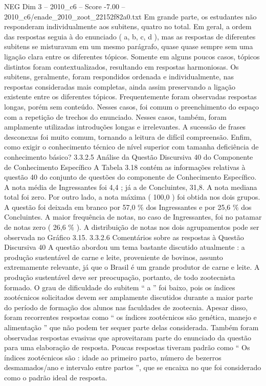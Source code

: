 \begin{textsample}{NEG Dim 3 – 2010\_c6 – Score -7.00 – 2010\_c6/enade\_2010\_zoot\_22152f82a0.txt}
Em grande parte, os estudantes não responderam individualmente aos subitens, quatro no total.
Em geral, a ordem das respostas seguia à do enunciado ( a, b, c, d ), mas as respostas de diferentes subitens se misturavam em um mesmo parágrafo, quase quase sempre sem uma ligação clara entre os diferentes tópicos.
Somente em alguns poucos casos, tópicos distintos foram contextualizados, resultando em respostas harmoniosas.
Os subitens, geralmente, foram respondidos ordenada e individualmente, nas respostas consideradas mais completas, ainda assim preservando a ligação existente entre os diferentes tópicos.
Frequentemente foram observadas respostas longas, porém sem conteúdo.
Nesses casos, foi comum o preenchimento do espaço com a repetição de trechos do enunciado.
Nesses casos, também, foram amplamente utilizadas introduções longas e irrelevantes.
A sucessão de frases desconexas foi muito comum, tornando a leitura de difícil compreensão.
Enfim, como exigir o conhecimento técnico de nível superior com tamanha deficiência de conhecimento básico? 3.3.2.5 Análise da Questão Discursiva 40 do Componente de Conhecimento Específico A Tabela 3.18 contém as informações relativas à questão 40 do conjunto de questões do componente de Conhecimento Específico.
A nota média de Ingressantes foi 4,4 ; já a de Concluintes, 31,8.
A nota mediana total foi zero.
Por outro lado, a nota máxima ( 100,0 ) foi obtida nos dois grupos.
A questão foi deixada em branco por 57,0 \% dos Ingressantes e por 25,6 \% dos Concluintes.
A maior frequência de notas, no caso de Ingressantes, foi no patamar de notas zero ( 26,6 \% ).
A distribuição de notas nos dois agrupamentos pode ser observada no Gráfico 3.15. 3.3.2.6 Comentários sobre as respostas à Questão Discursiva 40 A questão abordou um tema bastante discutido atualmente : a produção sustentável de carne e leite, proveniente de bovinos, assunto extremamente relevante, já que o Brasil é um grande produtor de carne e leite.
A produção sustentável deve ser preocupação, portanto, de todo zootecnista formado.
O grau de dificuldade do subitem “ a ” foi baixo, pois os índices zootécnicos solicitados devem ser amplamente discutidos durante a maior parte do período de formação dos alunos nas faculdades de zootecnia.
Apesar disso, foram recorrentes respostas como “ os índices zootécnicos são genética, manejo e alimentação ” que não podem ter sequer parte delas considerada.
Também foram observadas respostas evasivas que aproveitaram parte do enunciado da questão para uma elaboração de resposta.
Poucas respostas tiveram padrão como “ Os índices zootécnicos são : idade ao primeiro parto, número de bezerros desmamados/ano e intervalo entre partos ”, que se encaixa no que foi considerado como o padrão ideal de resposta.

\end{textsample}
